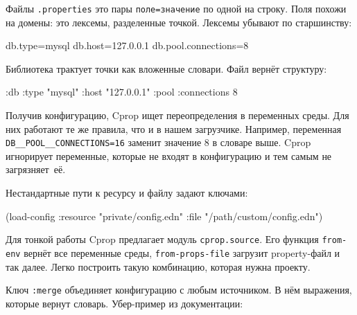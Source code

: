 
\begin{english}
\end{english}

Файлы \verb|.properties| это пары \verb|поле=значение| по одной на
строку. Поля похожи на домены: это лексемы, разделенные точкой. Лексемы убывают
по старшинству:

\begin{english}
  \begin{ini}
db.type=mysql
db.host=127.0.0.1
db.pool.connections=8
  \end{ini}
\end{english}

Библиотека трактует точки как вложенные словари. Файл вернёт структуру:

\begin{english}
  \begin{clojure}
{:db {:type "mysql"
      :host "127.0.0.1"
      :pool {:connections 8}}}
  \end{clojure}
\end{english}

Получив конфигурацию, Cprop ищет переопределения в переменных среды. Для них
работают те же правила, что и в нашем загрузчике. Например, переменная
\verb|DB__POOL__CONNECTIONS=16| заменит значение 8 в словаре выше. Cprop
игнорирует переменные, которые не входят в конфигурацию и тем самым не
загрязняет~её.

Нестандартные пути к ресурсу и файлу задают ключами:

\begin{english}
  \begin{clojure}
(load-config
 :resource "private/config.edn"
 :file "/path/custom/config.edn")
  \end{clojure}
\end{english}


Для тонкой работы Cprop предлагает модуль \verb|cprop.source|. Его функция
\verb|from-env| вернёт все переменные среды, \verb|from-props-file| загрузит
property-файл и так далее. Легко построить такую комбинацию, которая нужна
проекту.

Ключ \verb|:merge| объединяет конфигурацию с любым источником. В нём
выражения, которые вернут словарь. Убер-пример из документации:

